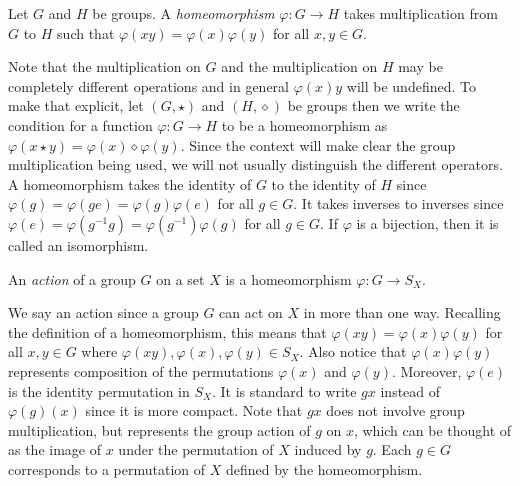 \begin{definition}
Let $G$ and $H$ be groups.  A \emph{homeomorphism} $\varphi: G \to H$ takes multiplication
from $G$ to $H$ such that $\varphi(xy) = \varphi(x)\varphi(y)$ for all $x, y \in G$.
\end{definition}

Note that the multiplication on $G$ and the multiplication on $H$ may be completely different operations
and in general $\varphi(x)y$ will be undefined.
To make that explicit, let $(G, \star)$ and $(H, \diamond)$ be groups then we write the
condition for a function $\varphi: G \to H$ to be a homeomorphism as
$\varphi(x \star y) = \varphi(x)  \diamond \varphi(y)$.  
Since the context will make clear the group multiplication being used, we will not usually
distinguish the different  operators.
A homeomorphism takes the identity of $G$ to the identity of $H$
since $\varphi(g) = \varphi(ge) = \varphi(g)\varphi(e)$ for all $g \in G$. It takes inverses to 
inverses since $\varphi(e) = \varphi(g^{-1}g) = \varphi(g^{-1})\varphi(g)$ for all $g \in G$.
If $\varphi$ is a bijection, then it is called an isomorphism.

\begin{definition}
An \emph{action} of a group $G$ on a set $X$ is a homeomorphism $\varphi: G \to S_X$.
\end{definition}

We say an action since a group $G$ can act on $X$ in more than one way. Recalling the
definition of a homeomorphism, this means that $\varphi(xy) = \varphi(x)\varphi(y)$ for all
$x, y \in G$ where $\varphi(xy), \varphi(x), \varphi(y) \in S_X$.  Also notice that
$\varphi(x)\varphi(y)$ represents composition of the permutations $\varphi(x)$ and 
$\varphi(y)$.  Moreover, $\varphi(e)$ is the identity permutation in $S_X$.
It is standard to write $gx$ instead of $\varphi(g)(x)$ since it is more compact.
Note that $gx$ does not involve group multiplication, but represents the group action
of $g$ on $x$, which can be thought of as the image of $x$ under the permutation of $X$
induced by $g$.  Each $g \in G$ corresponds to a permutation of $X$ defined by the
homeomorphism.

%
%



